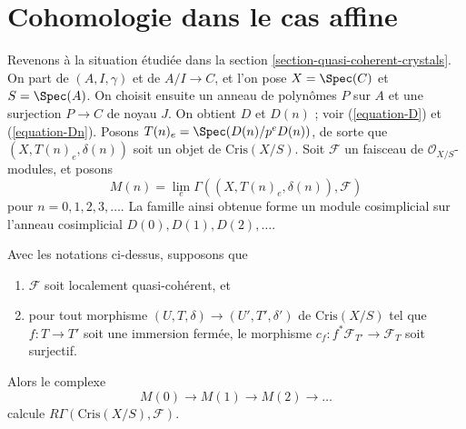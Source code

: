 \section{Cohomologie dans le cas affine}
\label{section-cohomology-affine}

\noindent
Revenons à la situation étudiée dans la
section \ref{section-quasi-coherent-crystals}. On
part de $(A, I, \gamma)$ et de $A/I \to C$, et l'on pose
$X = \Spec(C)$ et $S = \Spec(A)$. On choisit ensuite
un anneau de polynômes $P$ sur $A$ et une surjection $P \to C$ de
noyau $J$. On obtient $D$ et $D(n)$ ; voir
(\ref{equation-D}) et (\ref{equation-Dn}).
Posons $T(n)_e = \Spec(D(n)/p^eD(n))$, de sorte que
$(X, T(n)_e, \delta(n))$ soit un objet de $\text{Cris}(X/S)$.
Soit $\mathcal{F}$ un faisceau de $\mathcal{O}_{X/S}$-modules, et posons
$$
M(n) = \lim_e \Gamma((X, T(n)_e, \delta(n)), \mathcal{F})
$$
pour $n = 0, 1, 2, 3, \ldots$. La famille ainsi obtenue forme un module cosimplicial
sur l'anneau cosimplicial $D(0), D(1), D(2), \ldots$.

\begin{proposition}
\label{proposition-compute-cohomology}
Avec les notations ci-dessus, supposons que
\begin{enumerate}
\item $\mathcal{F}$ soit localement quasi-cohérent, et
\item pour tout morphisme $(U, T, \delta) \to (U', T', \delta')$
de $\text{Cris}(X/S)$ tel que $f : T \to T'$ soit une immersion fermée,
le morphisme $c_f : f^*\mathcal{F}_{T'} \to \mathcal{F}_T$ soit surjectif.
\end{enumerate}
Alors le complexe
$$
M(0) \to M(1) \to M(2) \to \ldots
$$
calcule $R\Gamma(\text{Cris}(X/S), \mathcal{F})$.
\end{proposition}

